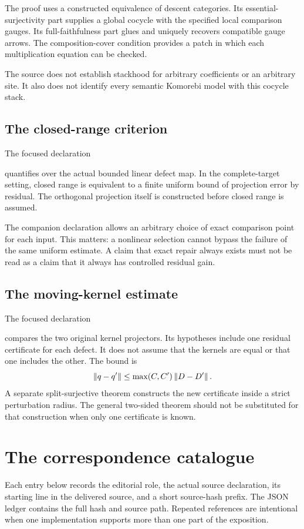 \documentclass[11pt]{article}
\begin{document}
The proof uses a constructed equivalence of descent categories. Its essential-surjectivity part supplies a global cocycle with the specified local comparison gauges. Its full-faithfulness part glues and uniquely recovers compatible gauge arrows. The composition-cover condition provides a patch in which each multiplication equation can be checked.

The source does not establish stackhood for arbitrary coefficients or an arbitrary site. It also does not identify every semantic Komorebi model with this cocycle stack.

\subsection{The closed-range criterion}
The focused declaration
\begin{center}\small{}\end{center}
quantifies over the actual bounded linear defect map. In the complete-target setting, closed range is equivalent to a finite uniform bound of projection error by residual. The orthogonal projection itself is constructed before closed range is assumed.

The companion declaration  allows an arbitrary choice of exact comparison point for each input. This matters: a nonlinear selection cannot bypass the failure of the same uniform estimate. A claim that exact repair always exists must not be read as a claim that it always has controlled residual gain.

\subsection{The moving-kernel estimate}
The focused declaration
\begin{center}\small{}\end{center}
compares the two original kernel projectors. Its hypotheses include one residual certificate for each defect. It does not assume that the kernels are equal or that one includes the other. The bound is
\[
 \left\lVert q-q'\right\rVert\le\max(C,C')\left\lVert D-D'\right\rVert.
\]
A separate split-surjective theorem constructs the new certificate inside a strict perturbation radius. The general two-sided theorem should not be substituted for that construction when only one certificate is known.

\clearpage\section{The correspondence catalogue}
Each entry below records the editorial role, the actual source declaration, its starting line in the delivered source, and a short source-hash prefix. The JSON ledger contains the full hash and source path. Repeated references are intentional when one implementation supports more than one part of the exposition.
\end{document}
